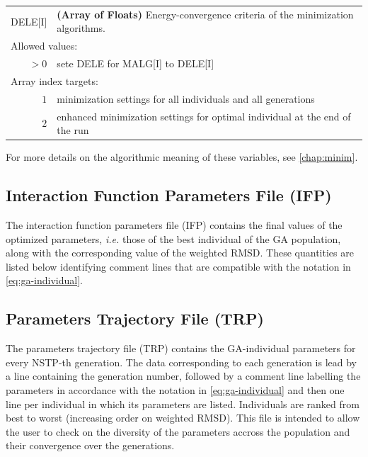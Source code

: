 \documentclass[10pt,a4paper]{report}
\numberwithin{equation}{section}
\begin{document}
{
\begin{tabular}{r@{ : }l}
\label{descr:dele}
      DELE[I]&\textbf{(Array of Floats)} Energy-convergence criteria of the minimization algorithms.                                          \\ 
\multicolumn{2}{l}{Allowed values:} \\ 
    \(>0\)&sete DELE for MALG[I] to DELE[I] \\ 
\multicolumn{2}{l}{Array index targets:} \\ 
  \(1\)&minimization settings for all individuals and all generations \\
  \(2\)&enhanced minimization settings for optimal individual at the end of the run \\
\end{tabular}
\vspace{1ex}
}

\noindent For more details on the algorithmic meaning of these variables, see \autoref{chap:minim}.



\subsection{Interaction Function Parameters File (IFP)}
\label{sec:file-formats-IFP}

The interaction function parameters file (IFP) contains the final
values of the optimized parameters, \textit{i.e.} those of the best
individual of the GA population, along with the corresponding value of
the weighted RMSD. These quantities are listed below identifying
comment lines that are compatible with the notation in
\autoref{eq:ga-individual}.

\subsection{Parameters Trajectory File (TRP)}
\label{sec:file-formats-TRP}

The parameters trajectory file (TRP) contains the GA-individual
parameters for every NSTP-th generation.  The data corresponding to
each generation is lead by a line containing the generation number,
followed by a comment line labelling the parameters in accordance with
the notation in \autoref{eq:ga-individual} and then one line per
individual in which its parameters are listed. Individuals are ranked
from best to worst (increasing order on weighted RMSD). This file is
intended to allow the user to check on the diversity of the parameters
accross the population and their convergence over the generations.
\end{document}
